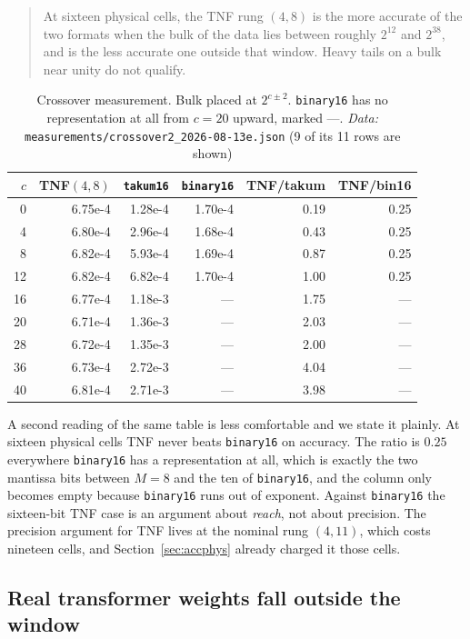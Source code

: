 \documentclass[11pt]{article}
\theoremstyle{definition}
\begin{document}
\begin{quote}
At sixteen physical cells, the TNF rung $(4,8)$ is the more accurate of the two
formats when the bulk of the data lies between roughly $2^{12}$ and $2^{38}$, and
is the less accurate one outside that window. Heavy tails on a bulk near unity do
not qualify.
\end{quote}

\begin{table}[htbp]\centering\small
\caption{Crossover measurement. Bulk placed at $2^{c\pm 2}$. \texttt{binary16}
has no representation at all from $c=20$ upward, marked ---. \emph{Data:} \texttt{measurements/crossover2\_2026-08-13e.json} (9 of its 11 rows are shown)}
\label{tab:window}
\begin{tabular}{rrrrrr}
\hline
$c$ & TNF$(4,8)$ & \texttt{takum16} & \texttt{binary16} & TNF/takum & TNF/bin16 \\
\hline
0 & 6.75e-4 & 1.28e-4 & 1.70e-4 & 0.19 & 0.25 \\
4 & 6.80e-4 & 2.96e-4 & 1.68e-4 & 0.43 & 0.25 \\
8 & 6.82e-4 & 5.93e-4 & 1.69e-4 & 0.87 & 0.25 \\
12 & 6.82e-4 & 6.82e-4 & 1.70e-4 & 1.00 & 0.25 \\
16 & 6.77e-4 & 1.18e-3 & --- & 1.75 & --- \\
20 & 6.71e-4 & 1.36e-3 & --- & 2.03 & --- \\
28 & 6.72e-4 & 1.35e-3 & --- & 2.00 & --- \\
36 & 6.73e-4 & 2.72e-3 & --- & 4.04 & --- \\
40 & 6.81e-4 & 2.71e-3 & --- & 3.98 & --- \\
\hline
\end{tabular}
\end{table}

A second reading of the same table is less comfortable and we state it plainly. At
sixteen physical cells TNF never beats \texttt{binary16} on accuracy. The ratio is
$0.25$ everywhere \texttt{binary16} has a representation at all, which is exactly
the two mantissa bits between $M{=}8$ and the ten of \texttt{binary16}, and the
column only becomes empty because \texttt{binary16} runs out of exponent. Against
\texttt{binary16} the sixteen-bit TNF case is an argument about \emph{reach}, not
about precision. The precision argument for TNF lives at the nominal rung
$(4,11)$, which costs nineteen cells, and Section~\ref{sec:accphys} already charged
it those cells.

\subsection{Real transformer weights fall outside the window}
\end{document}
